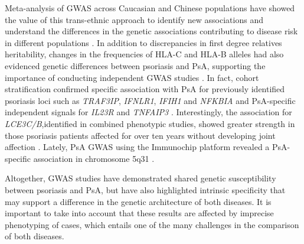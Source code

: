 Meta-analysis of GWAS across Caucasian and Chinese populations have showed the value of this trans-ethnic approach to identify new associations and understand the differences in the genetic associations contributing to disease risk in different populations \parencite{Yin2015}. %
In addition to discrepancies in first degree relatives heritability, changes in the frequencies of HLA-C and HLA-B alleles had also evidenced genetic differences between psoriasis and PsA, supporting the importance of conducting independent GWAS studies \parencite{Winchester2012, Okada2014}. In fact, cohort stratification confirmed specific association with PsA for previously identified psoriasis loci such as \textit{TRAF3IP}, \textit{IFNLR1}, \textit{IFIH1} and \textit{NFKBIA} and PsA-specific independent signals for \textit{IL23R} and \textit{TNFAIP3} \parencite{Ellinghaus2010, Stuart2015}.  Interestingly, the association for \textit{LCE3C/B},identified in combined phenotypic studies, showed greater strength in those psoriasis patients affected for over ten years without developing joint affection \parencite{Stuart2015}. Lately, PsA GWAS using the Immunochip platform revealed a PsA-specific association in chromosome 5q31 \parencite{Bowes2015}. 

Altogether, GWAS studies have demonstrated shared genetic susceptibility between psoriasis and PsA, but have also highlighted intrinsic specificity that may support a difference in the genetic architecture of both diseases. It is important to take into account that these results are affected by imprecise phenotyping of cases, which entails one of the many challenges in the comparison of both diseases.


